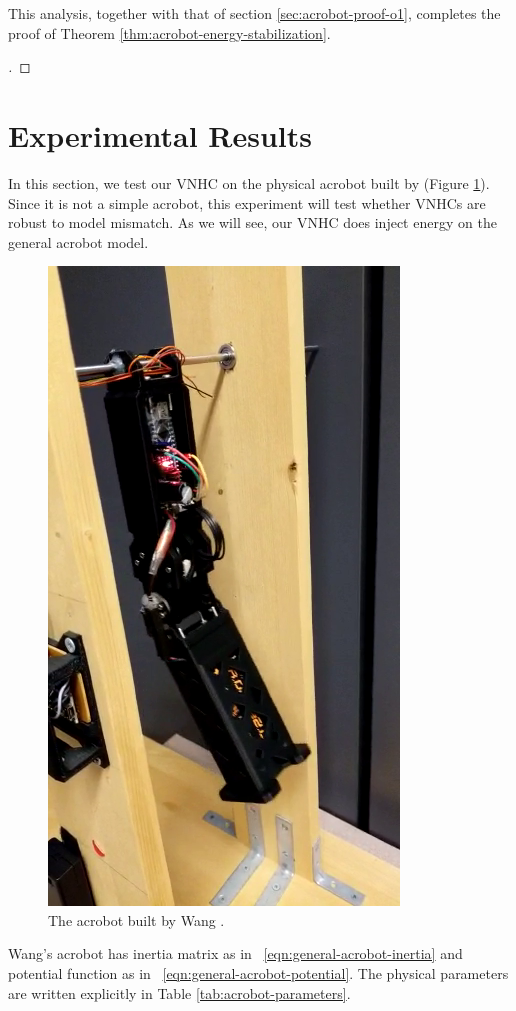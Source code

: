 This analysis, together with that of section \ref{sec:acrobot-proof-o1},
completes the proof of Theorem \ref{thm:acrobot-energy-stabilization}.

\begin{proof}[\unskip\nopunct]
\end{proof}

\section{Experimental Results}
In this section, we test our VNHC on the physical acrobot built by
\citet{xingbo_thesis} (Figure \ref{fig:xingbo-acrobot}).
Since it is not a simple acrobot, this experiment will test whether VNHCs are
robust to model mismatch.
As we will see, our VNHC does inject energy on the general acrobot model.

\begin{figure}
    \centering
    \includegraphics[width=0.5\linewidth]{images/xingbo_acrobot.png}
    \caption{The acrobot built by Wang \cite{xingbo_thesis}.}
    \label{fig:xingbo-acrobot}
\end{figure}

Wang's acrobot  has inertia matrix as in ~\eqref{eqn:general-acrobot-inertia}
and potential function as in ~\eqref{eqn:general-acrobot-potential}.
The physical parameters are written explicitly in Table
\ref{tab:acrobot-parameters}.

